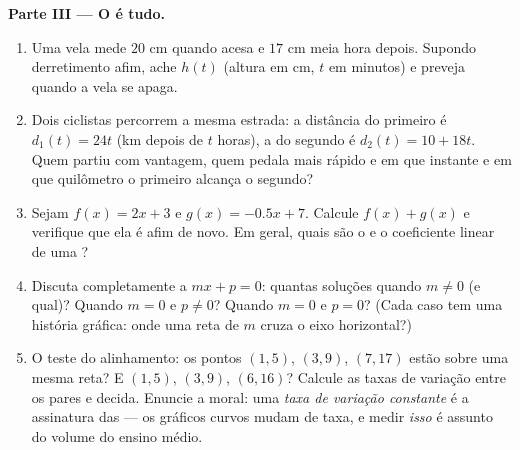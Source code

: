 \begin{problem}
\medskip
\noindent\textbf{Parte III --- O  é tudo.}
\begin{enumerate}[resume]
  \item Uma vela mede $20$ cm quando acesa e $17$ cm meia hora depois.
        Supondo derretimento afim, ache $h(t)$ (altura em cm, $t$ em
        minutos) e preveja quando a vela se apaga.
  \item Dois ciclistas percorrem a mesma estrada: a distância do
        primeiro é $d_1(t) = 24t$ (km depois de $t$ horas), a do
        segundo é $d_2(t) = 10 + 18t$. Quem partiu com vantagem, quem
        pedala mais rápido e em que instante e em que quilômetro o
        primeiro alcança o segundo?
  \item Sejam $f(x) = 2x + 3$ e $g(x) = -0.5x + 7$. Calcule
        $f(x) + g(x)$ e verifique que ela é afim de novo. Em geral,
        quais são o  e o coeficiente linear de uma
        ?
  \item Discuta completamente a  $mx + p = 0$: quantas soluções
        quando $m \neq 0$ (e qual)? Quando $m = 0$ e $p \neq 0$? Quando
        $m = 0$ e $p = 0$? (Cada caso tem uma história gráfica: onde uma
        reta de  $m$ cruza o eixo horizontal?)
  \item O teste do alinhamento: os pontos $(1, 5)$, $(3, 9)$,
        $(7, 17)$ estão sobre uma mesma reta? E $(1, 5)$, $(3, 9)$,
        $(6, 16)$? Calcule as taxas de variação entre os pares e
        decida. Enuncie a moral: uma \emph{taxa de variação constante}
        é a assinatura das  --- os gráficos curvos mudam
        de taxa, e medir \emph{isso} é assunto do volume do ensino
        médio.
\end{enumerate}
\end{problem}

